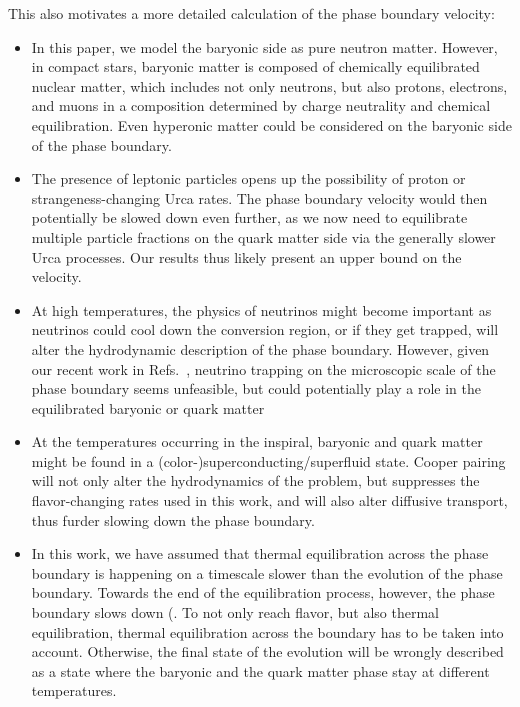 \documentclass[10pt,superscriptaddress,
amsmath,aps,prc,twocolumn,nofootinbib,floatfix]{revtex4-1}
\newcommand{\AHcom}[1]{\textsf{\color{cyan}{\textsuperscript{AH}#1}}}
\begin{document}
{This also motivates a more detailed calculation of the phase boundary velocity:
\begin{itemize}[leftmargin=*]
    \item In this paper, we model the baryonic side as pure neutron matter. However, in compact stars, baryonic matter is composed of chemically equilibrated nuclear matter, which includes not only neutrons, but also protons, electrons, and muons in a composition determined by charge neutrality and chemical equilibration. Even hyperonic matter could be considered on the baryonic side of the phase boundary.
    \item The presence of leptonic particles opens up the possibility of proton or strangeness-changing Urca rates. The phase boundary velocity would then potentially be slowed down even further, as we now need to equilibrate multiple particle fractions on the quark matter side via the generally slower Urca processes. Our results thus likely present an upper bound on the velocity.
    \item At high temperatures, the physics of neutrinos might become important as neutrinos could cool down the conversion region, or if they get trapped, will alter the hydrodynamic description of the phase boundary. However, given our recent work in Refs.~\cite{Alford:2025jtm,Alford:2026kwd}, neutrino trapping on the microscopic scale of the phase boundary seems unfeasible, but could potentially play a role in the equilibrated baryonic or quark matter
    \item At the temperatures occurring in the inspiral, baryonic and quark matter might be found in a (color-)superconducting/superfluid state. Cooper pairing will not only alter the hydrodynamics of the problem, but suppresses the flavor-changing rates used in this work, and will also alter diffusive transport, thus furder slowing down the phase boundary.
    \item In this work, we have assumed that thermal equilibration across the phase boundary is happening on a timescale slower than the evolution of the phase boundary. Towards the end of the equilibration process, however, the phase boundary slows down (\AHcom{do we have a section explaining this?}. To not only reach flavor, but also thermal equilibration, thermal equilibration across the boundary has to be taken into account. Otherwise, the final state of the evolution will be wrongly described as a state where the baryonic and the quark matter phase stay at different temperatures.


\end{itemize}}
\end{document}
